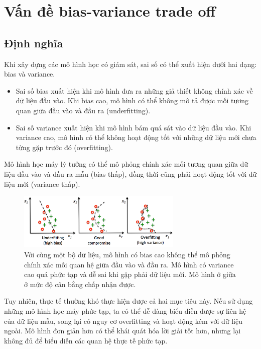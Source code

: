 \documentclass[12pt]{extreport}
\begin{document}
\section{Vấn đề bias-variance trade off}

\subsection{Định nghĩa}

Khi xây dựng các mô hình học có giám sát, sai số có thể xuất hiện dưới hai dạng: bias và variance.

\begin{itemize}
    \item Sai số bias xuất hiện khi mô hình đưa ra những giả thiết không chính xác về dữ liệu đầu vào. Khi bias cao, mô hình có thể không mô tả được mối tương quan giữa đầu vào và đầu ra (underfitting).
    \item Sai số variance xuất hiện khi mô hình bám quá sát vào dữ liệu đầu vào. Khi variance cao, mô hình có thể không hoạt động tốt với những dữ liệu mới chưa từng gặp trước đó (overfitting).
\end{itemize}

Mô hình học máy lý tưởng có thể mô phỏng chính xác mối tương quan giữa dữ liệu đầu vào và đầu ra mẫu (bias thấp), đồng thời cũng phải hoạt động tốt với dữ liệu mới (variance thấp).

\begin{figure}[H]
    \centering
    \includegraphics[width=0.7\textwidth]{figure2}
    \caption{Với cùng một bộ dữ liệu, mô hình có bias cao không thể mô phỏng chính xác mối quan hệ giữa đầu vào và đầu ra. Mô hình có variance cao quá phức tạp và dễ sai khi gặp phải dữ liệu mới. Mô hình ở giữa ở mức độ cân bằng chấp nhận được.}
\end{figure}

Tuy nhiên, thực tế thường khó thực hiện được cả hai mục tiêu này. Nếu sử dụng những mô hình học máy phức tạp, ta có thể dễ dàng biểu diễn được sự liên hệ của dữ liệu mẫu, song lại có nguy cơ overfitting và hoạt động kém với dữ liệu ngoài. Mô hình đơn giản hơn có thể khái quát hóa lời giải tốt hơn, nhưng lại không đủ để biểu diễn các quan hệ thực tế phức tạp.
\end{document}

